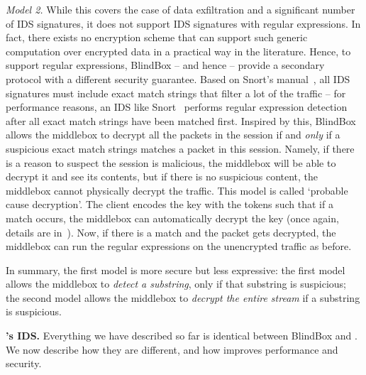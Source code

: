  {\em Model 2.}  While this covers the case of data exfiltration and a significant number of IDS signatures, it does not support  IDS signatures with regular expressions.
 In fact, there exists no encryption scheme that can support such generic computation over encrypted data in a practical way in the literature. 
  Hence, to support regular expressions, BlindBox -- and hence \sys -- provide a secondary protocol with a different security guarantee. 
  Based on Snort's manual~\cite{Snort}, all  IDS signatures must include exact match strings that filter a lot of the traffic -- for performance reasons, an IDS like Snort~\cite{Snort} performs regular expression detection after all exact match strings have been matched first.
  Inspired by this, BlindBox allows the middlebox to decrypt all the packets in the session if and {\it only} if a suspicious exact match strings matches a packet in this session.
  Namely, if there is a reason to suspect the session is malicious, the middlebox will be able to decrypt it and see its contents, but if there is no suspicious content, the middlebox cannot physically decrypt the traffic.  This model is called `probable cause decryption'.
  The client encodes the key with the tokens such that if a match occurs, the middlebox can automatically decrypt the key (once again, details are in~\cite{blindbox}).
  Now, if there is a match and the packet gets decrypted, the middlebox can run the regular expressions on the unencrypted traffic as before. 
  
  
  In summary, the first model is more secure but less expressive: 
  the first model allows the middlebox to {\it detect a substring}, only if that substring is suspicious;
  the second model allows the middlebox to {\it decrypt the entire stream} if a substring is suspicious.
  
\noindent\textbf{\sys's IDS.}  
  Everything we have described so far is identical between BlindBox and \sys. We now describe how they are different, and how \sys improves performance and security.

